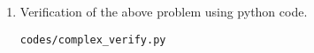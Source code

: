 \documentclass[journal,12pt,twocolumn]{IEEEtran}
\renewcommand\thesection{\arabic{section}}
\begin{document}
\renewcommand{\theequation}{\theenumi}
\begin{enumerate}[label=\thesection.\arabic*.,ref=\thesection.\theenumi]
\item Verification of the above problem using python code.\\
\begin{lstlisting}
codes/complex_verify.py
\end{lstlisting}

\end{enumerate}
\end{document}
